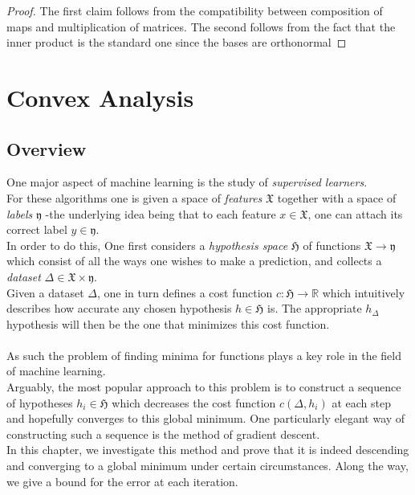 \documentclass{book}
\theoremstyle{plain}
\theoremstyle{definition}
\renewcommand{\d}[1]{\mathbb{#1}}
\newcommand{\f}[1]{\mathfrak{#1}}
\newcommand{\mor}{\longrightarrow}
\begin{document}
\begin{proof}
	The first claim follows from the compatibility between composition of maps and multiplication of matrices. The second follows from the fact that the inner product is the standard one since the bases are orthonormal
\end{proof}

\chapter{Convex Analysis}



\section{Overview}
One major aspect of machine learning is the study of \emph{supervised learners}. \\
For these algorithms one is given a space of \emph{features} $\f{X}$ together with a space of \emph{labels} $\f{y}$ -the underlying idea being that to each feature $x \in \f{X}$, one can attach its correct label $y \in \f{y}$.\\ 
In order to do this, One first considers a \emph{hypothesis space} $\f{H}$ of functions $\f{X}\mor \f{y}$ which consist of all the ways one wishes to make a prediction, and collects a \emph{dataset} $\Delta \in \f{X}\times \f{y}$.\\
Given a dataset $\Delta$, one in turn defines a cost function $c: \f{H}\mor \d{R}$ which intuitively describes how accurate any chosen hypothesis $h \in \f{H}$ is. The appropriate $h_\Delta$ hypothesis will then be the one that minimizes this cost function.\\\\
As such the problem of finding minima for functions plays a key role in the field of machine learning.\\
Arguably, the most popular approach to this problem is to construct a sequence of hypotheses $h_i \in \f{H}$ which decreases the cost function $c(\Delta,h_i)$ at each step and hopefully converges to this global minimum. One particularly elegant way of constructing such a sequence is the method of gradient descent.\\
In this chapter, we investigate this method and prove that it is indeed descending and converging to a global minimum under certain circumstances. Along the way, we give a bound for the error at each iteration.
\end{document}
